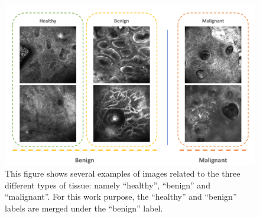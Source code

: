 \documentclass[journal,article,accept,moreauthors,pdftex, applsci]{Definitions/mdpi}
\begin{document}
\begin{figure}[H]
    \begin{center}
        \includegraphics[width=0.75\linewidth]{Figures/Data.pdf}
        \caption{This figure shows several examples of images related to the three different types of tissue: namely “healthy”, “benign” and “malignant”. For this work purpose, the “healthy” and “benign” labels are merged under the “benign” label.}
        \label{fig:data}
    \end{center} 
\end{figure}\par
\end{document}
